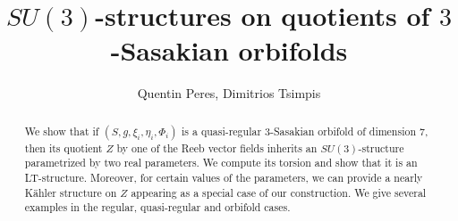 \documentclass[12pt, reqno]{amsart}
\theoremstyle{definition}
\begin{document}
\usetikzlibrary{positioning}
\setcounter{page}{1}

\title[$SU(3)$-structures on quotients of $3$-Sasakian orbifolds]{$SU(3)$-structures on quotients of $3$-Sasakian orbifolds}

\author{Quentin Peres, Dimitrios Tsimpis}
\address{Quentin Peres \\Institut Camille Jordan, Université Claude Bernard Lyon 1 \\ 21 Av. Claude Bernard, 69100 Villeurbanne, France}
\address{Dimitrios Tsimpis\\Institut de Physique des Deux Infinis de Lyon, Universit\'e de Lyon, UCBL, UMR 5822, CNRS/IN2P3, 4 rue Enrico Fermi, 69622 Villeurbanne Cedex, France}
\begin{abstract}
We show that if $(S,g,\xi_i,\eta_i,\Phi_i)$ is a quasi-regular $3$-Sasakian orbifold of dimension $7$, then its quotient $Z$ by one of the Reeb vector fields inherits an $SU(3)$-structure parametrized by two real parameters. We compute its torsion and show that it is an LT-structure. Moreover, for certain values of the parameters, we can provide a nearly Kähler structure on $Z$ appearing as a special case of our construction. We give several examples in the regular,  quasi-regular and orbifold cases. 
\end{abstract} \maketitle
\tableofcontents
\end{document}
